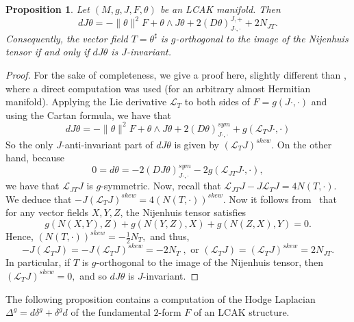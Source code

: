 \documentclass[a4paper,11pt]{amsart}
\newtheorem{prop}[thm]{Proposition}
\theoremstyle{definition}
\renewcommand{\[}{\begin{equation*}}
\renewcommand{\]}{\end{equation*}}
\begin{document}
\begin{prop}\label{j-invariance}\cite[Proposition 2.3]{MR4698640}
Let $(M, g, J, F, \theta)$ be an LCAK manifold. Then
\begin{equation}\label{dJtheta-formula}
 dJ\theta = -\|\theta\|^2 F + \theta \wedge J\theta+2(D \theta)^{J,+}_{J\cdot,\cdot}  + 2N_{JT}.
 \end{equation}
Consequently, the vector field $T=\theta^\sharp$ is $g$-orthogonal to the image of the Nijenhuis tensor if and only if $dJ\theta$ is $J$-invariant.
\end{prop}
 \begin{proof} For the sake of completeness, we give a proof here, slightly different than \cite[Proposition 2.3]{MR4698640}, where a direct computation was used (for an arbitrary almost Hermitian manifold). Applying the Lie derivative $\mathcal{L}_T$ to both sides of $F=g(J\cdot,\cdot)$ and using the Cartan formula, we have that 
 $$ dJ\theta = -\|\theta\|^2F+\theta\wedge J\theta+2\left( D\theta\right)^{sym}_{J\cdot,\cdot}+g(\mathcal{L}_TJ\cdot,\cdot) $$
 So the only $J$-anti-invariant part of $dJ\theta$ is given by $\left(\mathcal{L}_TJ\right)^{skew}$. On the other hand, because $$0=d\theta=-2\left(DJ\theta\right)^{sym}_{J\cdot,\cdot}-2g(\mathcal{L}_{JT}J\cdot,\cdot),$$
 we have that $\mathcal{L}_{JT}J$ is $g$-symmetric.
 Now, recall that $\mathcal{L}_{JT}J-J\mathcal{L}_TJ=4N(T,\cdot).$ We deduce that 
 $-J\left(\mathcal{L}_TJ\right)^{skew}=4\left(N(T,\cdot)\right)^{skew}.$
Now it follows from~\cite[Proposition 1]{MR1456265} that for any vector fields $X,Y,Z$, the Nijenhuis tensor satisfies
 $$g(N(X,Y),Z)+g(N(Y,Z),X)+g(N(Z,X),Y)=0.$$
  Hence,
$ \left(N(T,\cdot)\right)^{skew}=-\frac{1}{2}N_T,$ and thus, $$- J\left(\mathcal{L}_TJ\right) = -J\left(\mathcal{L}_TJ\right)^{skew}=-2N_T \; , \mbox{ or } \left(\mathcal{L}_TJ\right) = \left(\mathcal{L}_TJ\right)^{skew} = 2N_{JT}.$$
In particular, if $T$ is $g$-orthogonal to the image of the Nijenhuis tensor, then $\left(\mathcal{L}_TJ\right)^{skew}=0,$ and so $dJ\theta$ is $J$-invariant.
 \end{proof}

\noindent The following proposition contains a computation of the Hodge Laplacian $\Delta^g=d \delta^g + \delta^g d$ of the fundamental $2$-form $F$ of an LCAK structure.
\end{document}
